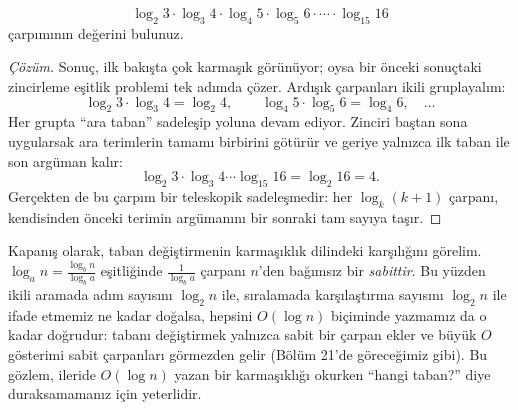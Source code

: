 \begin{example}
\[
\log_2 3 \cdot \log_3 4 \cdot \log_4 5 \cdot \log_5 6 \cdot \cdots \cdot \log_{15} 16
\]
çarpımının değerini bulunuz.
\end{example}

\begin{proof}[Çözüm]
Sonuç, ilk bakışta çok karmaşık görünüyor; oysa bir önceki sonuçtaki zincirleme eşitlik problemi tek adımda çözer. Ardışık çarpanları ikili gruplayalım:
\[
\log_2 3 \cdot \log_3 4 = \log_2 4, \qquad \log_4 5 \cdot \log_5 6 = \log_4 6, \quad \dots
\]
Her grupta ``ara taban'' sadeleşip yoluna devam ediyor. Zinciri baştan sona uygularsak ara terimlerin tamamı birbirini götürür ve geriye yalnızca ilk taban ile son argüman kalır:
\[
\log_2 3 \cdot \log_3 4 \cdots \log_{15} 16 = \log_2 16 = 4.
\]
Gerçekten de bu çarpım bir teleskopik sadeleşmedir: her $\log_k (k+1)$ çarpanı, kendisinden önceki terimin argümanını bir sonraki tam sayıya taşır.
\end{proof}

Kapanış olarak, taban değiştirmenin karmaşıklık dilindeki karşılığını görelim. $\log_a n = \frac{\log_b n}{\log_b a}$ eşitliğinde $\frac{1}{\log_b a}$ çarpanı $n$'den bağımsız bir \emph{sabittir}. Bu yüzden ikili aramada adım sayısını $\log_2 n$ ile, sıralamada karşılaştırma sayısını $\log_2 n$ ile ifade etmemiz ne kadar doğalsa, hepsini $O(\log n)$ biçiminde yazmamız da o kadar doğrudur: tabanı değiştirmek yalnızca sabit bir çarpan ekler ve büyük $O$ gösterimi sabit çarpanları görmezden gelir (Bölüm 21'de göreceğimiz gibi). Bu gözlem, ileride $O(\log n)$ yazan bir karmaşıklığı okurken ``hangi taban?'' diye duraksamamanız için yeterlidir.